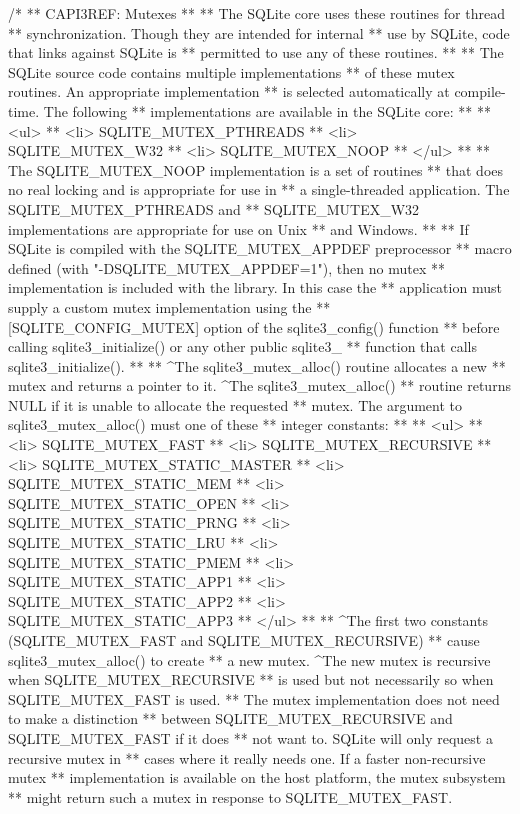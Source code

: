 \begin{Codex}[label=sqlite3.h,numbers=left]
{/*
** CAPI3REF: Mutexes
**
** The SQLite core uses these routines for thread
** synchronization. Though they are intended for internal
** use by SQLite, code that links against SQLite is
** permitted to use any of these routines.
**
** The SQLite source code contains multiple implementations
** of these mutex routines.  An appropriate implementation
** is selected automatically at compile-time.  The following
** implementations are available in the SQLite core:
**
** <ul>
** <li>   SQLITE_MUTEX_PTHREADS
** <li>   SQLITE_MUTEX_W32
** <li>   SQLITE_MUTEX_NOOP
** </ul>
**
** The SQLITE_MUTEX_NOOP implementation is a set of routines
** that does no real locking and is appropriate for use in
** a single-threaded application.  The SQLITE_MUTEX_PTHREADS and
** SQLITE_MUTEX_W32 implementations are appropriate for use on Unix
** and Windows.
**
** If SQLite is compiled with the SQLITE_MUTEX_APPDEF preprocessor
** macro defined (with "-DSQLITE_MUTEX_APPDEF=1"), then no mutex
** implementation is included with the library. In this case the
** application must supply a custom mutex implementation using the
** [SQLITE_CONFIG_MUTEX] option of the sqlite3_config() function
** before calling sqlite3_initialize() or any other public sqlite3_
** function that calls sqlite3_initialize().
**
** ^The sqlite3_mutex_alloc() routine allocates a new
** mutex and returns a pointer to it. ^The sqlite3_mutex_alloc()
** routine returns NULL if it is unable to allocate the requested
** mutex.  The argument to sqlite3_mutex_alloc() must one of these
** integer constants:
**
** <ul>
** <li>  SQLITE_MUTEX_FAST
** <li>  SQLITE_MUTEX_RECURSIVE
** <li>  SQLITE_MUTEX_STATIC_MASTER
** <li>  SQLITE_MUTEX_STATIC_MEM
** <li>  SQLITE_MUTEX_STATIC_OPEN
** <li>  SQLITE_MUTEX_STATIC_PRNG
** <li>  SQLITE_MUTEX_STATIC_LRU
** <li>  SQLITE_MUTEX_STATIC_PMEM
** <li>  SQLITE_MUTEX_STATIC_APP1
** <li>  SQLITE_MUTEX_STATIC_APP2
** <li>  SQLITE_MUTEX_STATIC_APP3
** </ul>
**
** ^The first two constants (SQLITE_MUTEX_FAST and SQLITE_MUTEX_RECURSIVE)
** cause sqlite3_mutex_alloc() to create
** a new mutex.  ^The new mutex is recursive when SQLITE_MUTEX_RECURSIVE
** is used but not necessarily so when SQLITE_MUTEX_FAST is used.
** The mutex implementation does not need to make a distinction
** between SQLITE_MUTEX_RECURSIVE and SQLITE_MUTEX_FAST if it does
** not want to.  SQLite will only request a recursive mutex in
** cases where it really needs one.  If a faster non-recursive mutex
** implementation is available on the host platform, the mutex subsystem
** might return such a mutex in response to SQLITE_MUTEX_FAST.
}
\end{Codex}
